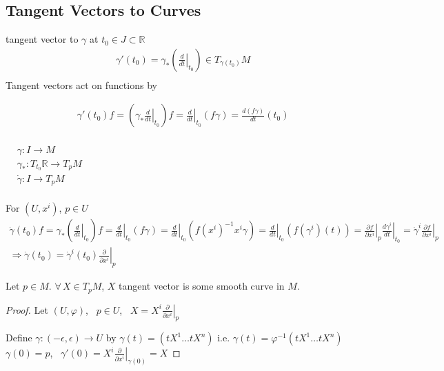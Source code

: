 \subsection*{ Tangent Vectors to Curves}

tangent vector to $\gamma$ at $t_0 \in J \subset \mathbb{R}$ 
\[
\begin{aligned}
  & \gamma'(t_0) = \gamma_* \left( \left. \frac{d}{dt} \right|_{t_0} \right) \in T_{\gamma(t_0)}M \\ 
\end{aligned}
\]
Tangent vectors act on functions by

\[
\begin{aligned}
  & \gamma'(t_0) f = \left( \left. \gamma_*  \frac{d}{dt} \right|_{t_0} \right) f = \left. \frac{d}{dt} \right|_{t_0}(f\gamma) = \frac{d(f\gamma)}{ dt}(t_0)
\end{aligned}
\]


$\begin{aligned}
  & \quad \\
  & \gamma : I \to M \\
  & \gamma_* : T_{t_0} \mathbb{R} \to T_p M \\
  & \dot{\gamma} : I \to T_p M \\
\end{aligned}$



For $(U,x^i)$, $p\in U$
\[
\begin{gathered}
\dot{\gamma}(t_0) f = \gamma_* \left( \left. \frac{d}{dt}  \right|_{t_0} \right) f = \left. \frac{d}{dt} \right|_{t_0} (f\gamma) = \left. \frac{d}{dt} \right|_{t_0} (f (x^i)^{-1} x^i \gamma ) = \left. \frac{d}{dt} \right|_{t_0} ( f( \gamma^i)(t) )  =  \left. \frac{ \partial f}{  \partial x^i } \right|_p \left. \frac{ d \gamma^i }{ dt} \right|_{t_0} = \dot{\gamma}^i \left. \frac{ \partial f}{ \partial x^i } \right|_p  \\
\Longrightarrow \dot{ \gamma}(t_0) = \left. \dot{\gamma}^i(t_0) \frac{ \partial}{ \partial x^i} \right|_p
\end{gathered}
\]


\begin{lemma}[3.11] Let $p\in M$.  $\forall \, X \in T_p M$, $X$ tangent vector is some smooth curve in $M$. \end{lemma}

\begin{proof}
Let $(U,\varphi)$, \, $p \in U$, \, $X = X^i \left. \frac{ \partial }{ \partial x^i} \right|_p$

Define $\gamma: (-\epsilon, \epsilon) \to U$ by $\gamma(t) = (tX^1 \dots tX^n)$ i.e. $\gamma(t) = \varphi^{-1}(t X^1 \dots tX^n)$  \\
$\gamma(0) = p$,  \, $\gamma'(0) = X^i \left. \frac{ \partial }{ \partial x^i} \right|_{\gamma(0)} = X$


\end{proof}



